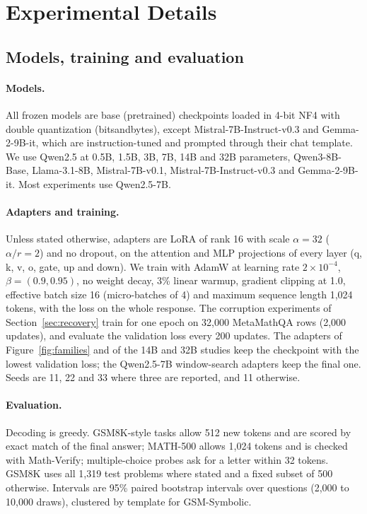 \section{Experimental Details}
\label{app:xp_details}

\subsection{Models, training and evaluation}
\label{app:setup}

\paragraph{Models.} All frozen models are base (pretrained) checkpoints loaded in 4-bit NF4 with double quantization (bitsandbytes), except Mistral-7B-Instruct-v0.3 and Gemma-2-9B-it, which are instruction-tuned and prompted through their chat template. We use Qwen2.5 at 0.5B, 1.5B, 3B, 7B, 14B and 32B parameters, Qwen3-8B-Base, Llama-3.1-8B, Mistral-7B-v0.1, Mistral-7B-Instruct-v0.3 and Gemma-2-9B-it. Most experiments use Qwen2.5-7B.

\paragraph{Adapters and training.} Unless stated otherwise, adapters are LoRA of rank 16 with scale $\alpha = 32$ ($\alpha/r = 2$) and no dropout, on the attention and MLP projections of every layer (q, k, v, o, gate, up and down). We train with AdamW at learning rate $2\times10^{-4}$, $\beta = (0.9, 0.95)$, no weight decay, 3\% linear warmup, gradient clipping at 1.0, effective batch size 16 (micro-batches of 4) and maximum sequence length 1,024 tokens, with the loss on the whole response. The corruption experiments of Section~\ref{sec:recovery} train for one epoch on 32,000 MetaMathQA rows (2,000 updates), and evaluate the validation loss every 200 updates. The adapters of Figure~\ref{fig:families} and of the 14B and 32B studies keep the checkpoint with the lowest validation loss; the Qwen2.5-7B window-search adapters keep the final one. Seeds are 11, 22 and 33 where three are reported, and 11 otherwise.

\paragraph{Evaluation.} Decoding is greedy. GSM8K-style tasks allow 512 new tokens and are scored by exact match of the final answer; MATH-500 allows 1,024 tokens and is checked with Math-Verify; multiple-choice probes ask for a letter within 32 tokens. GSM8K uses all 1,319 test problems where stated and a fixed subset of 500 otherwise. Intervals are 95\% paired bootstrap intervals over questions (2,000 to 10,000 draws), clustered by template for GSM-Symbolic.

